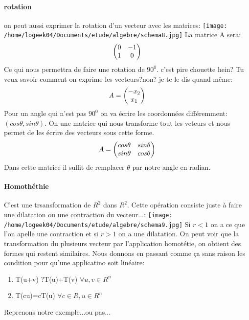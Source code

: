 \documentclass[a4paper,10pt]{article}
\begin{document}
\paragraph{rotation}
on peut aussi exprimer la rotation d'un vecteur avec les matrices:
\texttt{[image: /home/logeek04/Documents/etude/algebre/schema8.jpg]}
\newline
La matrice A sera:
\[
\begin{pmatrix}
0&-1\cr
1&0\cr
\end{pmatrix}
\]
\newline
Ce qui nous permettra de faire une rotation de $90^0$. c'est pire chouette hein? Tu veux savoir comment on exprime les vecteurs?non? je te le dis quand même:
\[
A=\begin{pmatrix}
-x_2\cr
x_1\cr
\end{pmatrix}
\]
\newline
Pour un angle qui n'est pas $90^0$ on va écrire les coordonnées différemment: $(cos\theta, sin \theta)$. On une matrice qui nous transforme tout les veteurs et nous permet de les écrire des vecteurs sous cette forme. 
\[
A=\begin{pmatrix}
cos\theta&sin\theta\cr
sin\theta&cos\theta\cr
\end{pmatrix}
\]
\newline
Dans cette matrice il suffit de remplacer $\theta$ par notre angle en radian.
\paragraph{Homothéthie}
C'est une trsansformation de $R^2$ dans $R^2$. Cette opération consiste juste à faire une dilatation ou une contraction du vecteur...:
\texttt{[image: /home/logeek04/Documents/etude/algebre/schema9.jpg]}
\newline
Si $r<1$ on a ce que l'on apelle une contraction et si $r>1$ on a une dilatation. On peut voir que la transformation du plusieurs vecteur par l'application homotétie, on obtient des formes qui restent similaires.
\newline
Nous donnons en passant comme ça sans raison les condition pour qu'une applicatino soit linéaire:
\begin{enumerate}
 \item T(u+v) ?T(u)+T(v) $\forall u,v\in R^n$
 \item T(cu)=cT(u) $\forall c\in R,u\in R^n$
\end{enumerate}

Reprenons notre exemple...ou pas...
\end{document}
